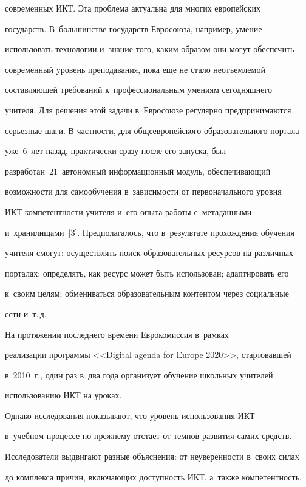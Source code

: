 современных ИКТ. Эта проблема актуальна для многих европейских 


государств. В~большинстве государств Евросоюза, например, умение 


использовать технологии и~знание того, каким образом они могут обеспечить 


современный уровень преподавания, пока еще не стало неотъемлемой 


составляющей требований к~профессиональным умениям сегодняшнего 


учителя. Для решения этой задачи в~Евросоюзе регулярно предпринимаются 


серьезные шаги. В частности, для общеевропейского образовательного портала 


уже~6~лет назад, практически сразу после его запуска, был 


разработан~21~автономный информационный модуль, обеспечивающий 


возможности для самообучения в~зависимости от первоначального уровня 


ИКТ-ком\-пе\-тент\-ности учителя и~его опыта работы с~метаданными 


и~хранилищами~[3]. Предполагалось, что в~результате прохождения обучения 


учителя смогут: осуществлять поиск образовательных ресурсов на различных 


порталах; определять, как ресурс может быть использован; адаптировать его 


к~своим целям; обмениваться образовательным контентом через социальные 


сети и~т.\,д. 


%


На протяжении последнего времени Еврокомиссия в~рамках 


реализации программы <<Digital agenda for Europe 2020>>, стартовавшей 


в~2010~г., один раз в~два года организует обучение школьных учителей 


использованию ИКТ на уроках.


  


  Однако исследования показывают, что уровень использования ИКТ 


в~учебном процессе по-прежнему отстает от темпов развития самих средств. 


Исследователи выдвигают разные объяснения: от неуверенности в~своих силах 


до комплекса причин, включающих доступность ИКТ, а~также компетентность, 


